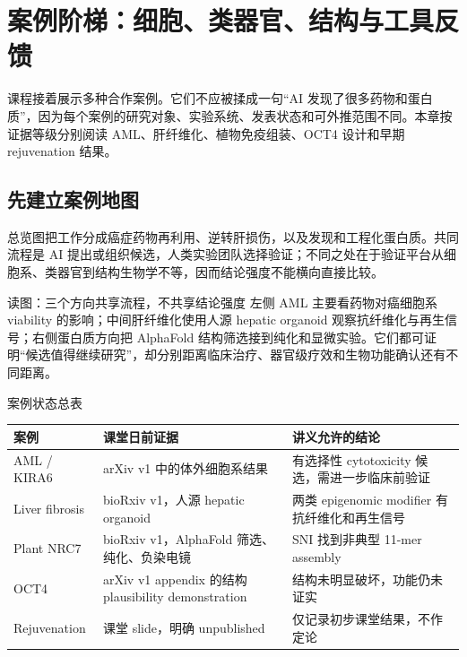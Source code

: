 \section{案例阶梯：细胞、类器官、结构与工具反馈}

课程接着展示多种合作案例。它们不应被揉成一句“AI 发现了很多药物和蛋白质”，因为每个案例的研究对象、实验系统、发表状态和可外推范围不同。本章按证据等级分别阅读 AML、肝纤维化、植物免疫组装、OCT4 设计和早期 rejuvenation 结果。

\subsection{先建立案例地图}

总览图把工作分成癌症药物再利用、逆转肝损伤，以及发现和工程化蛋白质。共同流程是 AI 提出或组织候选，人类实验团队选择验证；不同之处在于验证平台从细胞系、类器官到结构生物学不等，因而结论强度不能横向直接比较。


\begin{knowledgebox}{读图：三个方向共享流程，不共享结论强度}
左侧 AML 主要看药物对癌细胞系 viability 的影响；中间肝纤维化使用人源 hepatic organoid 观察抗纤维化与再生信号；右侧蛋白质方向把 AlphaFold 结构筛选接到纯化和显微实验。它们都可证明“候选值得继续研究”，却分别距离临床治疗、器官级疗效和生物功能确认还有不同距离。
\end{knowledgebox}

\begin{importantbox}{案例状态总表}
\begin{tabularx}{\textwidth}{L{0.20\textwidth}X X}
\toprule
案例 & 课堂日前证据 & 讲义允许的结论 \\
\midrule
AML / KIRA6 & arXiv v1 中的体外细胞系结果 & 有选择性 cytotoxicity 候选，需进一步临床前验证 \\
Liver fibrosis & bioRxiv v1，人源 hepatic organoid & 两类 epigenomic modifier 有抗纤维化和再生信号 \\
Plant NRC7 & bioRxiv v1，AlphaFold 筛选、纯化、负染电镜 & SNI 找到非典型 11-mer assembly \\
OCT4 & arXiv v1 appendix 的结构 plausibility demonstration & 结构未明显破坏，功能仍未证实 \\
Rejuvenation & 课堂 slide，明确 unpublished & 仅记录初步课堂结果，不作定论 \\
\bottomrule
\end{tabularx}
\end{importantbox}

